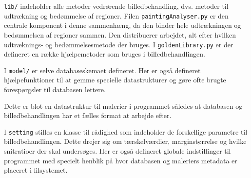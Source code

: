 {\texttt{lib/} indeholder alle metoder vedrørende billedbehandling, dvs.
metoder til udtrækning og bedømmelse af regioner. Filen
\texttt{paintingAnalyser.py} er den centrale komponent i denne
sammenhæng, da den binder hele udtrækningen og bedømmelsen af regioner
sammen. Den distribuerer arbejdet, alt efter hvilken udtræknings- og
bedømmelsesmetode der bruges.  I \texttt{goldenLibrary.py} er der
defineret en række hjælpemetoder som bruges i billedbehandlingen.

\vspace{1.4em}
\vspace{1.4em}

I \texttt{model/} er selve databaseskemaet defineret. Her er også
defineret hjælpefunktioner til at gemme specielle datastrukturer og
gøre ofte brugte forespørgsler til databasen lettere.

\vspace{1.4em}
\vspace{1.4em}

Dette er blot en datastruktur til malerier i programmet således at
databasen og billedbehandlingen har et fælles format at arbejde efter.

\vspace{1.4em}
\vspace{1.4em}

I \texttt{setting} stilles en klasse til rådighed som indeholder de
forskellige parametre til billedbehandlingen. Dette drejer sig om
tærskelværdier, marginstørrelse og hvilke snitratioer der skal
undersøges. Her er også defineret globale indstillinger til programmet
med specielt henblik på hvor databasen og maleriers metadata er placeret
i filsystemet.

}

